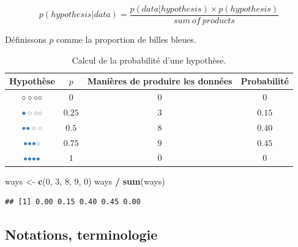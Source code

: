 \documentclass[
  a4paper,11pt,twoside,onecolumn,openright,final,oldfontcommands]{memoir}
\newenvironment{Shaded}{\begin{snugshade}}{\end{snugshade}}
\newcommand{\DecValTok}[1]{\textcolor[rgb]{0.00,0.00,0.81}{#1}}
\newcommand{\KeywordTok}[1]{\textcolor[rgb]{0.13,0.29,0.53}{\textbf{#1}}}
\newcommand{\NormalTok}[1]{#1}
\newcommand{\OperatorTok}[1]{\textcolor[rgb]{0.81,0.36,0.00}{\textbf{#1}}}
\newcommand{\StringTok}[1]{\textcolor[rgb]{0.31,0.60,0.02}{#1}}
\theoremstyle{definition}
\theoremstyle{definition}
\theoremstyle{definition}
\theoremstyle{remark}
\begin{document}
\[p(hypothesis|data) = \frac{p(data|hypothesis) \times p(hypothesis)}{sum\ of\ products}\]

Définissons \(p\) comme la proportion de billes bleues.

\begin{table}[!htb]

\begin{center}
\begin{threeparttable}

\caption{\label{tab:enumeration-table}Calcul de la probabilité d'une hypothèse.}

\begin{tabular}{cccc}
\toprule
Hypothèse & $p$ & Manières de produire les données & Probabilité\\
\midrule
$\LARGE \circ \circ \circ \circ$ & $0$ & $0$ & $0$\\
$\LARGE \color{steelblue}{\bullet} \circ \circ \circ$ & $0.25$ & $3$ & $0.15$\\
$\LARGE \color{steelblue}{\bullet} \color{steelblue}{\bullet} \circ \circ$ & $0.5$ & $8$ & $0.40$\\
$\LARGE \color{steelblue}{\bullet} \color{steelblue}{\bullet} \color{steelblue}{\bullet} \circ$ & $0.75$ & $9$ & $0.45$\\
$\LARGE \color{steelblue}{\bullet} \color{steelblue}{\bullet} \color{steelblue}{\bullet} \color{steelblue}{\bullet}$ & $1$ & $0$ & $0$\\
\bottomrule
\end{tabular}

\end{threeparttable}
\end{center}

\end{table}

\begin{Shaded}
\begin{Highlighting}[]
\NormalTok{ways \textless{}{-}}\StringTok{ }\KeywordTok{c}\NormalTok{(}\DecValTok{0}\NormalTok{, }\DecValTok{3}\NormalTok{, }\DecValTok{8}\NormalTok{, }\DecValTok{9}\NormalTok{, }\DecValTok{0}\NormalTok{)}
\NormalTok{ways }\OperatorTok{/}\StringTok{ }\KeywordTok{sum}\NormalTok{(ways)}
\end{Highlighting}
\end{Shaded}

\begin{verbatim}
## [1] 0.00 0.15 0.40 0.45 0.00
\end{verbatim}

\hypertarget{notations-terminologie}{%
\subsection{Notations, terminologie}\label{notations-terminologie}}
\end{document}
